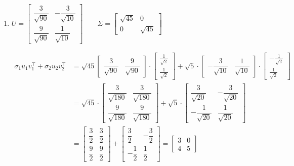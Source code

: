 \begin{enumerate}[label=\color{red}\textbf{\arabic*)}, leftmargin=*]
\begin{enumerate}[label=\color{red}\alph*)]
		\item {}
		
		$U=\begin{bmatrix}
		\dfrac{3}{\sqrt{90}} & -\dfrac{3}{\sqrt{10}}\\
		\dfrac{9}{\sqrt{90}} & \dfrac{1}{\sqrt{10}}
		\end{bmatrix}\qquad\Sigma=\begin{bmatrix}
		\sqrt{45} & 0\\
		0 & \sqrt{45}
		\end{bmatrix}$
		
		$\begin{aligned}
		\sigma_1u_1v_1^\intercal+\sigma_2u_2v_2^\intercal&=\sqrt{45}\begin{bmatrix}
		\dfrac{3}{\sqrt{90}} & \dfrac{9}{\sqrt{90}}
		\end{bmatrix}\cdot\begin{bmatrix}
		\frac{1}{\sqrt{2}}\\
		\frac{1}{\sqrt{2}}
		\end{bmatrix}+\sqrt{5}\cdot\begin{bmatrix}
		-\dfrac{3}{\sqrt{10}} & \dfrac{1}{\sqrt{10}}
		\end{bmatrix}\cdot\begin{bmatrix}
		-\frac{1}{\sqrt{2}}\\
		\frac{1}{\sqrt{2}}
		\end{bmatrix}\\
		&=\sqrt{45}\cdot\begin{bmatrix}
		\dfrac{3}{\sqrt{180}} & \dfrac{3}{\sqrt{180}}\\
		\dfrac{9}{\sqrt{180}} & \dfrac{9}{\sqrt{180}}
		\end{bmatrix}+\sqrt{5}\cdot\begin{bmatrix}
		\dfrac{3}{\sqrt{20}} & -\dfrac{3}{\sqrt{20}}\\
		-\dfrac{1}{\sqrt{20}} & \dfrac{1}{\sqrt{20}}
		\end{bmatrix}\\
		&=\begin{bmatrix}
		\dfrac{3}{2} & \dfrac{3}{2}\\
		\dfrac{9}{2} & \dfrac{9}{2}
		\end{bmatrix}+\begin{bmatrix}
		\dfrac{3}{2} & -\dfrac{3}{2}\\
		-\dfrac{1}{2} & \dfrac{1}{2}
		\end{bmatrix}=\begin{bmatrix}
		3 & 0\\
		4 & 5
		\end{bmatrix}
		\end{aligned}$
		

\end{enumerate}
\end{enumerate}
